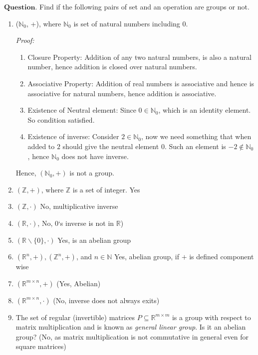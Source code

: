 \documentclass{article}
\begin{document}
$\boldsymbol{Question}$. Find if the following pairs of set and an operation are groups or not.
\begin{enumerate}
    \item ($\mathbb{N}_0$, +), where $\mathbb{N}_0$ is set of natural numbers including 0.\par
    \textit{Proof: } 
        \begin{enumerate}
            \item Closure Property: Addition of any two natural numbers, is also a natural number, hence addition is closed over natural numbers.
            \item Associative Property: Addition of real numbers is associative and hence is associative for natural numbers, hence addition is associative.
            \item Existence of Neutral element: Since $0\in \mathbb{N}_0$, which is an identity element. So condition satisfied.
            \item Existence of inverse: Consider $2\in \mathbb{N}_0$, now we need something that when added to $2$ should give the neutral element $0$. Such an element is $-2\notin \mathbb{N}_0$, hence $\mathbb{N}_0$ does not have inverse.
        \end{enumerate}
        Hence, $(\mathbb{N}_0, +)$ is not a group.
    \item $(\mathbb{Z}, +)$, where $\mathbb{Z}$ is a set of integer. Yes
    \item $(\mathbb{Z}, \cdot)$ No, multiplicative inverse
    \item $(\mathbb{R}, \cdot)$, No, 0`s inverse is not in $\mathbb{R}$)
    \item $(\mathbb{R} \backslash \{0\}, \cdot)$ Yes, is an abelian group
    \item $(\mathbb{R}^n, +), (\mathbb{Z}^n, +)$, and $n \in \mathbb{N}$ Yes, abelian group, if $+$ is defined component wise
    \item $(\mathbb{R}^{m\times n}, +)$ (Yes, Abelian)
    \item $(\mathbb{R}^{m\times n}, \cdot)$ (No, inverse does not always exits)
    \item The set of regular (invertible) matrices  $P\subseteq \mathbb{R}^{m\times m}$ is a group with respect to matrix multiplication and is known as \textit{general linear group}. Is it an abelian group? (No, as matrix multiplication is not commutative in general even for square matrices)
\end{enumerate}
\end{document}
